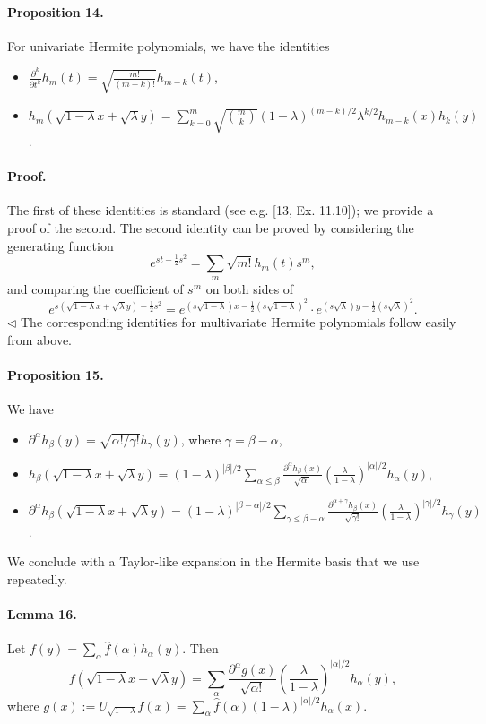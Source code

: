\paragraph{Proposition 14.} For univariate Hermite polynomials, we have the identities
\begin{itemize}
\item $\frac{\partial^k}{\partial t^k}h_m(t)=\sqrt{\frac{m!}{(m-k)!}}h_{m-k}(t)$,
\item $h_m(\sqrt{1-\lambda}x+\sqrt\lambda y)=\sum_{k=0}^m\sqrt{\binom mk}(1-\lambda)^{(m-k)/2}\lambda^{k/2}h_{m-k}(x)h_k(y)$.
\end{itemize}
\paragraph{Proof.} The first of these identities is standard (see e.g. [13, Ex. 11.10]); we provide a proof of the second.
The second identity can be proved by considering the generating function
\[e^{st-\frac12s^2}=\sum_m\sqrt{m!}h_m(t)s^m,\]
and comparing the coefficient of $s^m$ on both sides of
\[e^{s(\sqrt{1-\lambda}x+\sqrt\lambda y)-\frac12s^2}=e^{(s\sqrt{1-\lambda})x-\frac12(s\sqrt{1-\lambda})^2}\cdot e^{(s\sqrt\lambda)y-\frac12(s\sqrt\lambda)^2}.\]\hfill$\triangleleft$
The corresponding identities for multivariate Hermite polynomials follow easily from above.
\paragraph{Proposition 15.} We have
\begin{itemize}
\item $\partial^\alpha h_\beta(y)=\sqrt{\alpha!/\gamma!}h_\gamma(y)$, where $\gamma=\beta-\alpha$,
\item $h_\beta(\sqrt{1-\lambda}x+\sqrt\lambda y)=(1-\lambda)^{|\beta|/2}\sum_{\alpha\leq\beta}\frac{\partial^\alpha h_\beta(x)}{\sqrt{\alpha!}}\left(\frac\lambda{1-\lambda}\right)^{|\alpha|/2}h_\alpha(y)$,
\item $\partial^\alpha h_\beta(\sqrt{1-\lambda}x+\sqrt\lambda y)=(1-\lambda)^{|\beta-\alpha|/2}\sum_{\gamma\leq\beta-\alpha}\frac{\partial^{\alpha+\gamma}h_\beta(x)}{\sqrt{\gamma!}}\left(\frac\lambda{1-\lambda}\right)^{|\gamma|/2}h_\gamma(y)$.
\end{itemize}
We conclude with a Taylor-like expansion in the Hermite basis that we use repeatedly.
\paragraph{Lemma 16.} Let $f(y)=\sum_\alpha\widehat f(\alpha)h_\alpha(y)$. Then
\[f(\sqrt{1-\lambda}x+\sqrt\lambda y)=\sum_\alpha\frac{\partial^\alpha g(x)}{\sqrt{\alpha!}}\left(\frac\lambda{1-\lambda}\right)^{|\alpha|/2}h_\alpha(y),\]
where $g(x):=U_{\sqrt{1-\lambda}}f(x)=\sum_\alpha\widehat f(\alpha)(1-\lambda)^{|\alpha|/2}h_\alpha(x)$.
